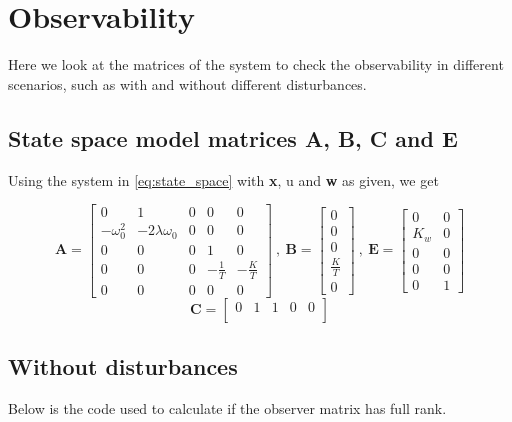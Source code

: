 
\section{Observability} \label{sec:part4}
Here we look at the matrices of the system to check the  observability in different scenarios, such as with and without different disturbances. 

\subsection{State space model matrices A, B, C and E}
Using the system in \cref{eq:state_space} with \textbf{x}, u and \textbf{w} as given, we get

\begin{equation}
    \boldsymbol{A} = \begin{bmatrix}
        0 & 1 & 0 & 0 & 0 \\
        -\omega_0^2 & -2\lambda \omega_0 & 0 & 0 & 0 \\
        0 & 0 & 0 & 1 & 0 \\
        0 & 0 & 0 & -\frac{1}{T} & -\frac{K}{T} \\
        0 & 0 & 0 & 0 & 0 
    \end{bmatrix} \ , \ \boldsymbol{B} = \begin{bmatrix}
        0 \\ 0 \\ 0 \\ \frac{K}{T} \\ 0
    \end{bmatrix}\ , \ \boldsymbol{E} = \begin{bmatrix}
        0 & 0 \\
        K_w & 0 \\
        0 & 0 \\
        0 & 0 \\
        0 & 1 
    \end{bmatrix}
\end{equation}
\begin{equation}
    \boldsymbol{C} = \begin{bmatrix}
        0 & 1 & 1 & 0 & 0 \\
    \end{bmatrix}
\end{equation}

\subsection{Without disturbances}
Below is the code used to calculate if the observer matrix has full rank. 
\inputminted[linenos]{matlab}{Part4_pics/p4_til_rapport.m}

